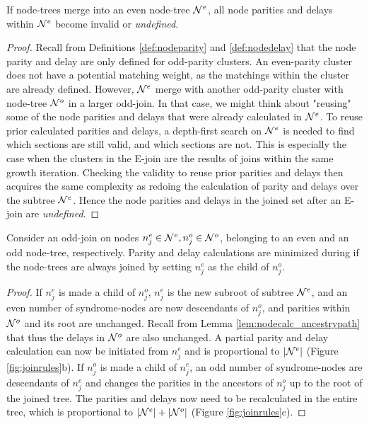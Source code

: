\begin{lemma}\label{lem:nodecalc_even}
  If node-trees merge into an even node-tree $\mathcal{N}^e$, all node parities and delays within $\mathcal{N}^e$ become invalid or \emph{undefined}. 
\end{lemma}
\begin{proof}
  Recall from Definitions \ref{def:nodeparity} and \ref{def:nodedelay} that the node parity and delay are only defined for odd-parity clusters. An even-parity cluster does not have a potential matching weight, as the matchings within the cluster are already defined. However, $\mathcal{N}^e$ merge with another odd-parity cluster with node-tree $\mathcal{N}^o$ in a larger odd-join. In that case, we might think about "reusing" some of the node parities and delays that were already calculated in $\mathcal{N}^e$. To reuse prior calculated parities and delays, a depth-first search on $\mathcal{N}^e$ is needed to find which sections are still valid, and which sections are not. This is especially the case when the clusters in the E-join are the results of joins within the same growth iteration. Checking the validity to reuse prior parities and delays then acquires the same complexity as redoing the calculation of parity and delays over the subtree $\mathcal{N}^e$. Hence the node parities and delays in the joined set after an E-join are \emph{undefined}.
\end{proof}

\begin{lemma}\label{lem:nodecalc_odd}
  Consider an odd-join on nodes $n_j^e \in \mathcal{N}^e, n_j^o\in \mathcal{N}^o$, belonging to an even and an odd node-tree, respectively. Parity and delay calculations are minimized during if the node-trees are always joined by setting $n_j^e$ as the child of $n_j^o$. 
\end{lemma}
\begin{proof}
  If $n_j^e$ is made a child of $n_j^o$, $n_j^e$ is the new subroot of subtree $\mathcal{N}^e$, and an even number of syndrome-nodes are now descendants of $n_j^o$, and parities within $\mathcal{N}^o$ and its root are unchanged. Recall from Lemma \ref{lem:nodecalc_ancestrypath} that thus the delays in $\mathcal{N}^o$ are also unchanged. A partial parity and delay calculation can now be initiated from $n_j^e$ and is proportional to $|\mathcal{N}^e|$ (Figure \ref{fig:joinrules}b). If $n_j^o$ is made a child of $n_j^e$, an odd number of syndrome-nodes are descendants of $n_j^e$ and changes the parities in the ancestors of $n_j^o$ up to the root of the joined tree. The parities and delays now need to be recalculated in the entire tree, which is proportional to $|\mathcal{N}^e| + |\mathcal{N}^o|$ (Figure \ref{fig:joinrules}c). 
\end{proof}

